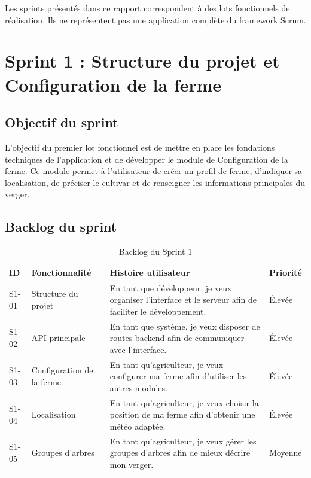 \documentclass[12pt,a4paper]{report}
\begin{document}
Les sprints présentés dans ce rapport correspondent à des lots fonctionnels de réalisation. Ils ne représentent pas une application complète du framework Scrum.

\section{Sprint 1 : Structure du projet et Configuration de la ferme}

\subsection{Objectif du sprint}

L'objectif du premier lot fonctionnel est de mettre en place les fondations techniques de l'application et de développer le module de Configuration de la ferme. Ce module permet à l'utilisateur de créer un profil de ferme, d'indiquer sa localisation, de préciser le cultivar et de renseigner les informations principales du verger.

\subsection{Backlog du sprint}

\begin{table}[H]
\centering
\caption{Backlog du Sprint 1}
\label{tab:backlog-sprint1}
\begin{tabular}{|p{1.4cm}|p{4.5cm}|p{6.6cm}|p{2cm}|}
\hline
\textbf{ID} & \textbf{Fonctionnalité} & \textbf{Histoire utilisateur} & \textbf{Priorité} \\
\hline
S1-01 & Structure du projet & En tant que développeur, je veux organiser l'interface et le serveur afin de faciliter le développement. & Élevée \\
\hline
S1-02 & API principale & En tant que système, je veux disposer de routes backend afin de communiquer avec l'interface. & Élevée \\
\hline
S1-03 & Configuration de la ferme & En tant qu'agriculteur, je veux configurer ma ferme afin d'utiliser les autres modules. & Élevée \\
\hline
S1-04 & Localisation & En tant qu'agriculteur, je veux choisir la position de ma ferme afin d'obtenir une météo adaptée. & Élevée \\
\hline
S1-05 & Groupes d'arbres & En tant qu'agriculteur, je veux gérer les groupes d'arbres afin de mieux décrire mon verger. & Moyenne \\
\hline
\end{tabular}
\end{table}
\end{document}
